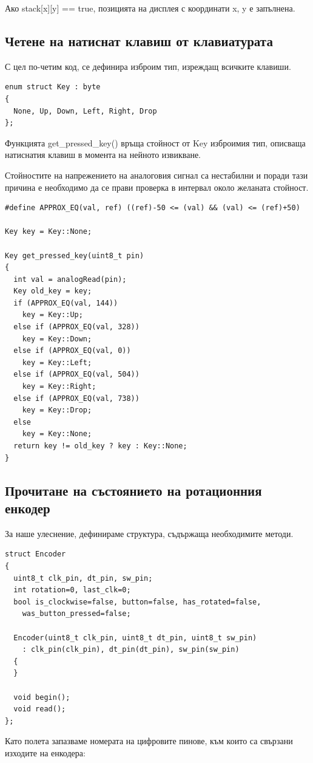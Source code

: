 \documentclass[titlepage, oneside, 14pt]{extbook}
\renewcommand{\texttt}[1]{{\small\ttfamily #1}}
\begin{document}
Ако \texttt{stack[x][y] == true}, позицията на дисплея с координати \texttt{x}, \texttt{y} е запълнена.

\subsection{Четене на натиснат клавиш от клавиатурата}

С цел по-четим код, се дефинира изброим тип, изреждащ всичките клавиши.

\begin{verbatim}
enum struct Key : byte
{
  None, Up, Down, Left, Right, Drop
};
\end{verbatim}

Функцията \texttt{get_pressed_key()} връща стойност от \texttt{Key} изброимия
тип, описваща натиснатия клавиш в момента на нейното извикване.

Стойностите на напрежението на аналоговия сигнал са нестабилни и поради тази причина е необходимо
да се прави проверка в интервал около желаната стойност.

\begin{verbatim}
#define APPROX_EQ(val, ref) ((ref)-50 <= (val) && (val) <= (ref)+50)

Key key = Key::None;

Key get_pressed_key(uint8_t pin)
{
  int val = analogRead(pin);
  Key old_key = key;
  if (APPROX_EQ(val, 144))
    key = Key::Up;
  else if (APPROX_EQ(val, 328))
    key = Key::Down;
  else if (APPROX_EQ(val, 0))
    key = Key::Left;
  else if (APPROX_EQ(val, 504))
    key = Key::Right;
  else if (APPROX_EQ(val, 738))
    key = Key::Drop;
  else
    key = Key::None;
  return key != old_key ? key : Key::None;
}
\end{verbatim}

\subsection{Прочитане на състоянието на ротационния енкодер}

За наше улеснение, дефинираме структура, съдържаща необходимите методи.

\begin{verbatim}
struct Encoder
{
  uint8_t clk_pin, dt_pin, sw_pin;
  int rotation=0, last_clk=0;
  bool is_clockwise=false, button=false, has_rotated=false,
    was_button_pressed=false;

  Encoder(uint8_t clk_pin, uint8_t dt_pin, uint8_t sw_pin)
    : clk_pin(clk_pin), dt_pin(dt_pin), sw_pin(sw_pin)
  {
  }

  void begin();
  void read();
};

\end{verbatim}
Като полета запазваме номерата на цифровите пинове, към които са свързани изходите на енкодера:
\end{document}
